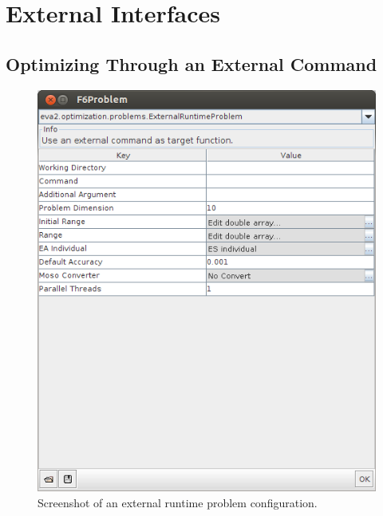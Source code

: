 \chapter{External Interfaces\label{sec:External-Interfaces}}


\section{Optimizing Through an External Command\label{sub:Optimizing-external-cmd}}

\begin{figure}
\noindent \begin{centering}
\includegraphics[width=0.4\columnwidth]{pics/screenshot-ExtRun}
\par\end{centering}

\caption{Screenshot of an external runtime problem configuration.\label{fig:Screenshot-external-runtime}}
\end{figure}


